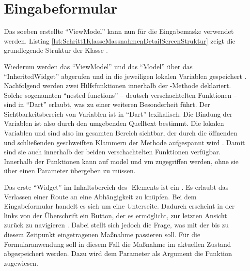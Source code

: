 \section{Eingabeformular}
  
Das soeben erstellte \enquote{ViewModel} kann nun für die Eingabemaske verwendet werden.
Listing \ref{lst:Schritt1KlasseMassnahmenDetailScreenStruktur} zeigt die grundlegende Struktur der Klasse .

    
Wiederum werden das \enquote{ViewModel} und das \enquote{Model} über das \enquote{InheritedWidget}  abgerufen und in die jeweiligen lokalen Variablen gespeichert .
Nachfolgend werden zwei Hilfsfunktionen innerhalb der -Methode deklariert.
Solche sogenannten \enquote{nested functions} -- deutsch
verschachtelten Funktionen -- sind in \enquote{Dart} erlaubt, was zu einer weiteren Besonderheit führt.
Der Sichtbarkeitsbereich von Variablen ist in \enquote{Dart} lexikalisch.
Die Bindung der Variablen ist also durch den umgebenden Quelltext bestimmt.
Die lokalen Variablen  und  sind also im gesamten Bereich sichtbar, der durch die öffnenden und schließenden geschweiften Klammern der Methode  aufgespannt wird .
Damit sind sie auch innerhalb der beiden verschachtelten Funktionen verfügbar.
Innerhalb der Funktionen kann auf model und vm zugegriffen werden, ohne sie über einen Parameter übergeben zu müssen.


Das erste \enquote{Widget} im Inhaltsbereich des -Elements ist ein .
Es erlaubt das Verlassen einer Route an eine Abhängigkeit zu knüpfen.
Bei dem Eingabeformular handelt es sich um eine Unterseite.
Dadurch erscheint in der   links von der Überschrift ein Button, der es ermöglicht, zur letzten Ansicht zurück zu navigieren \Abb{\ref{fig:Schritt1Eingabemaske}}.
Dabei stellt sich jedoch die Frage, was mit der bis zu diesem Zeitpunkt eingetragenen Maßnahme passieren soll.
Für die Formularanwendung soll in diesem Fall die Maßnahme im aktuellen Zustand abgespeichert werden.
Dazu wird dem Parameter  als Argument die Funktion  zugewiesen.

